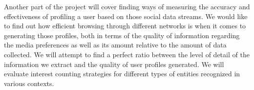 \documentclass{article}
\begin{document}
Another part of the project will cover finding ways of measuring the accuracy and effectiveness of profiling a user based on those social data streams. We would like to find out how efficient browsing through different networks is when it comes to generating those profiles, both in terms of the quality of information regarding the media preferences as well as its amount relative to the amount of data collected. We will attempt to find a perfect ratio between the level of detail of the information we extract and the quality of user profiles generated. We will evaluate interest counting strategies for different types of entities recognized in various contexts.  

\end{document}
